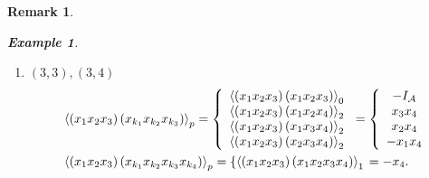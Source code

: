 \documentclass[aps,preprint]{revtex4}%
\newtheorem{example}[theorem]{Example}
\newtheorem{remark}[theorem]{Remark}
\begin{document}
\begin{remark}
\begin{example}
\begin{enumerate}
\begin{enumerate}
\begin{align}
{}\right)  \right\rangle _{p}=\left\{
\begin{array}
[c]{c}%
\left\langle \left(  x_{1}x_{2}\right)  \left(  x_{1}x_{2}x_{3}\right)
\right\rangle _{1}\\
\left\langle \left(  x_{1}x_{2}\right)  \left(  x_{1}x_{2}x_{4}\right)
\right\rangle _{1}\\
\left\langle \left(  x_{1}x_{2}\right)  \left(  x_{1}x_{3}x_{4}\right)
\right\rangle _{3}\\
\left\langle \left(  x_{1}x_{2}\right)  \left(  x_{2}x_{3}x_{4}\right)
\right\rangle _{3}%
\end{array}
\right.  =\left\{
\begin{array}
[c]{c}%
-x_{3}\\
-x_{4}\\
-x_{2}x_{3}x_{4}\\
x_{1}x_{3}x_{4}%
\end{array}
\right. \\
&  =\\
&  \left\langle \left(  x_{1}x_{2}\right)  \left(  x_{k_{1}}x_{k_{2}}x_{k_{3}%
}x_{k_{4}}\right)  \right\rangle _{p}=\left\{  \left\langle \left(  x_{1}%
x_{2}\right)  \left(  x_{1}x_{2}x_{3}x_{4}\right)  \right\rangle _{2}\right.
=-x_{3}x_{4}.
\end{align}


\item $\left(  3,3\right)  ,\left(  3,4\right)  $%
\begin{align}
&  \left\langle \left(  x_{1}x_{2}x_{3}\right)  \left(  x_{k_{1}}x_{k_{2}%
}x_{k_{3}}\right)  \right\rangle _{p}=\left\{
\begin{array}
[c]{c}%
\left\langle \left(  x_{1}x_{2}x_{3}\right)  \left(  x_{1}x_{2}x_{3}\right)
\right\rangle _{0}\\
\left\langle \left(  x_{1}x_{2}x_{3}\right)  \left(  x_{1}x_{2}x_{4}\right)
\right\rangle _{2}\\
\left\langle \left(  x_{1}x_{2}x_{3}\right)  \left(  x_{1}x_{3}x_{4}\right)
\right\rangle _{2}\\
\left\langle \left(  x_{1}x_{2}x_{3}\right)  \left(  x_{2}x_{3}x_{4}\right)
\right\rangle _{2}%
\end{array}
\right.  =\left\{
\begin{array}
[c]{c}%
-I_{\mathcal{A}}\\
x_{3}x_{4}\\
x_{2}x_{4}\\
-x_{1}x_{4}%
\end{array}
\right. \\
&  \left\langle \left(  x_{1}x_{2}x_{3}\right)  \left(  x_{k_{1}}x_{k_{2}%
}x_{k_{3}}x_{k_{4}}\right)  \right\rangle _{p}=\left\{  \left\langle \left(
x_{1}x_{2}x_{3}\right)  \left(  x_{1}x_{2}x_{3}x_{4}\right)  \right\rangle
_{1}\right.  =-x_{4}.
\end{align}



\end{enumerate}
\end{enumerate}
\end{example}
\end{remark}
\end{document}
